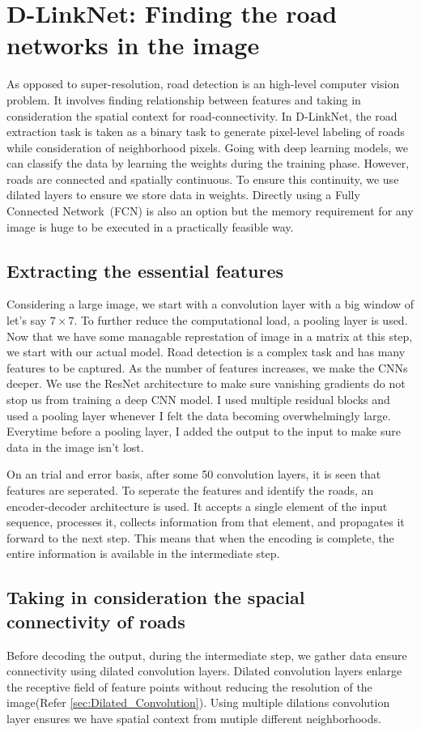 \section{D-LinkNet: Finding the road networks in the image}
As opposed to super-resolution, road detection is an high-level computer vision problem. It involves finding relationship between features and taking in consideration the spatial context for road-connectivity. In D-LinkNet, the road extraction task is taken as a binary task to generate pixel-level labeling of roads while consideration of neighborhood pixels. Going with deep learning models, we can classify the data by learning the weights during the training phase. However, roads are connected and spatially continuous. To ensure this continuity, we use dilated layers to ensure we store data in weights. Directly using a Fully Connected Network~(FCN) is also an option but the memory requirement for any image is huge to be executed in a practically feasible way.

\subsection{Extracting the essential features}
Considering a large image, we start with a convolution layer with a big window of let's say $7\times7$. To further reduce the computational load, a pooling layer is used. Now that we have some managable represtation of image in a matrix at this step, we start with our actual model. Road detection is a complex task and has many features to be captured. As the number of features increases, we make the CNNs deeper. We use the ResNet architecture to make sure vanishing gradients do not stop us from training a deep CNN model. I used multiple residual blocks and used a pooling layer whenever I felt the data becoming overwhelmingly large. Everytime before a pooling layer, I added the output to the input to make sure data in the image isn't lost.

On an trial and error basis, after some 50 convolution layers, it is seen that features are seperated. To seperate the features and identify the roads, an encoder-decoder architecture is used. It accepts a single element of the input sequence, processes it, collects information from that element, and propagates it forward to the next step. This means that when the encoding is complete, the entire information is available in the intermediate step.

\subsection{Taking in consideration the spacial connectivity of roads}
Before decoding the output, during the intermediate step, we gather data ensure connectivity using dilated convolution layers. Dilated convolution layers enlarge the receptive field of feature points without reducing the resolution of the image(Refer \cref{sec:Dilated_Convolution}). Using multiple dilations convolution layer ensures we have spatial context from mutiple different neighborhoods.

